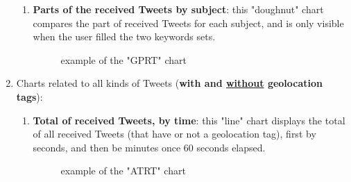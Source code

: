 \documentclass[a4paper,11pt]{report}
\begin{document}
\begin{enumerate}
\begin{enumerate}
		\item \textbf{Parts of the received Tweets by subject}: this "doughnut" chart compares the part of received Tweets for each subject, and is only visible when the user filled the two keywords sets.
		\begin{figure}[H]
		\vspace{-5pt}
		\begin{center}
		\vspace{-5pt}
		\caption{example of the "GPRT" chart}
		\end{center}
		\end{figure}
		\vspace{-10pt}
	\end{enumerate}
	
	\item Charts related to all kinds of Tweets (\textbf{with and \underline{without} geolocation tags}):
	 \begin{enumerate}
	 	\item \textbf{Total of received Tweets, by time}: this "line" chart displays the total of all received Tweets (that have or not a geolocation tag), first by seconds, and then be minutes once 60 seconds elapsed.
	 	\begin{figure}[H]
		\vspace{-5pt}
		\begin{center}
		\vspace{-5pt}
		\caption{example of the "ATRT" chart}
		\end{center}
		\end{figure}
		\vspace{-10pt}
		\newpage		
		

\end{enumerate}
\end{enumerate}
\end{document}

